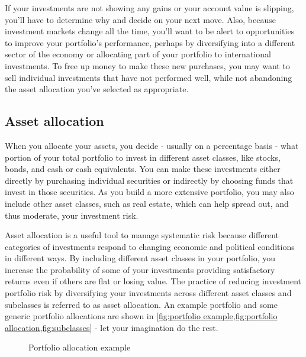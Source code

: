 If your investments are not showing any gains or your account value is slipping, you'll have to determine why and decide on your next move. Also, because investment markets change all the time, you'll want to be alert to opportunities to improve your portfolio's performance, perhaps by diversifying into a different sector of the economy or allocating part of your portfolio to international investments. To free up money to make these new purchases, you may want to sell individual investments that have not performed well, while not abandoning the asset allocation you've selected as appropriate.


\subsection{Asset allocation}
When you allocate your assets, you decide - usually on a percentage basis - what portion of your total portfolio to invest in different asset classes, like stocks, bonds, and cash or cash equivalents. You can make these investments either directly by purchasing individual securities or indirectly by choosing funds that invest in those securities. As you build a more extensive portfolio, you may also include other asset classes, such as real estate, which can help spread out, and thus moderate, your investment risk.

Asset allocation is a useful tool to manage systematic risk because different categories of investments respond to changing economic and political conditions in different ways. By including different asset classes in your portfolio, you increase the probability of some of your investments providing satisfactory returns even if others are flat or losing value. The practice of reducing investment portfolio risk by diversifying your investments across different asset classes and subclasses is referred to as asset allocation. An example portfolio and some generic portfolio allocations are shown in \cref{fig:portfolio example,fig:portfolio allocation,fig:subclasses} - let your imagination do the rest.

\begin{figure}
    \centering
   
    
    \caption{Portfolio allocation example}
    \label{fig:portfolio example}
\end{figure}

